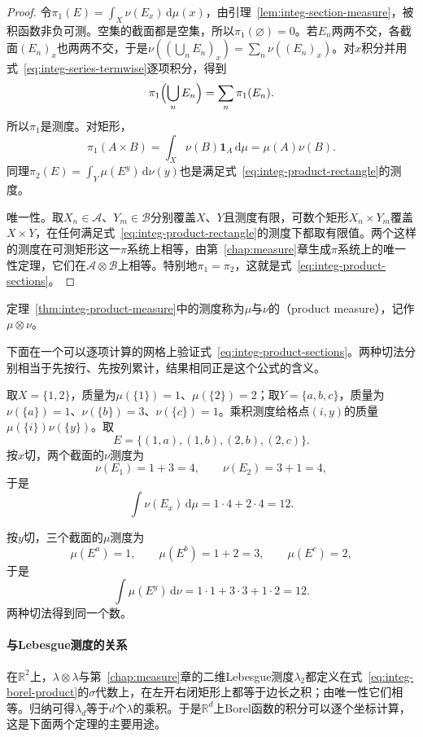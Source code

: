 \begin{proof}
令$\pi_1(E)=\int_X\nu(E_x)\,\mathrm d\mu(x)$，由引理~\ref{lem:integ-section-measure}，被积函数非负可测。空集的截面都是空集，所以$\pi_1(\varnothing)=0$。若$E_n$两两不交，各截面$(E_n)_x$也两两不交，于是$\nu((\bigcup_nE_n)_x)=\sum_n\nu((E_n)_x)$。对$x$积分并用式~\eqref{eq:integ-series-termwise}逐项积分，得到
\[
 \pi_1\Bigl(\bigcup_nE_n\Bigr)=\sum_n\pi_1(E_n).
\]
所以$\pi_1$是测度。对矩形，
\[
 \pi_1(A\times B)=\int_X\nu(B)\mathbf 1_A\,\mathrm d\mu=\mu(A)\nu(B).
\]
同理$\pi_2(E)=\int_Y\mu(E^y)\,\mathrm d\nu(y)$也是满足式~\eqref{eq:integ-product-rectangle}的测度。

唯一性。取$X_n\in\mathcal A$、$Y_m\in\mathcal B$分别覆盖$X$、$Y$且测度有限，可数个矩形$X_n\times Y_m$覆盖$X\times Y$，在任何满足式~\eqref{eq:integ-product-rectangle}的测度下都取有限值。两个这样的测度在可测矩形这一$\pi$系统上相等，由第~\ref{chap:measure}章生成$\pi$系统上的唯一性定理，它们在$\mathcal A\otimes\mathcal B$上相等。特别地$\pi_1=\pi_2$，这就是式~\eqref{eq:integ-product-sections}。
\end{proof}

\begin{definition}[乘积测度]
\label{def:integ-product-measure}
定理~\ref{thm:integ-product-measure}中的测度称为$\mu$与$\nu$的（product measure），记作$\mu\otimes\nu$。
\end{definition}

下面在一个可以逐项计算的网格上验证式~\eqref{eq:integ-product-sections}。两种切法分别相当于先按行、先按列累计，结果相同正是这个公式的含义。

\begin{example}[有限网格上的乘积测度]
\label{ex:integ-product-grid}
取$X=\{1,2\}$，质量为$\mu(\{1\})=1$、$\mu(\{2\})=2$；取$Y=\{a,b,c\}$，质量为$\nu(\{a\})=1$、$\nu(\{b\})=3$、$\nu(\{c\})=1$。乘积测度给格点$(i,y)$的质量$\mu(\{i\})\nu(\{y\})$。取
\[
 E=\{(1,a),(1,b),(2,b),(2,c)\}.
\]
按$x$切，两个截面的$\nu$测度为
\[
 \nu(E_1)=1+3=4,\qquad\nu(E_2)=3+1=4,
\]
于是
\[
 \int\nu(E_x)\,\mathrm d\mu=1\cdot4+2\cdot4=12 .
\]

按$y$切，三个截面的$\mu$测度为
\[
 \mu(E^a)=1,\qquad\mu(E^b)=1+2=3,\qquad\mu(E^c)=2,
\]
于是
\[
 \int\mu(E^y)\,\mathrm d\nu=1\cdot1+3\cdot3+1\cdot2=12 .
\]
两种切法得到同一个数。
\end{example}

\paragraph{与Lebesgue测度的关系}
在$\mathbb R^2$上，$\lambda\otimes\lambda$与第~\ref{chap:measure}章的二维Lebesgue测度$\lambda_2$都定义在式~\eqref{eq:integ-borel-product}的$\sigma$代数上，在左开右闭矩形上都等于边长之积；由唯一性它们相等。归纳可得$\lambda_d$等于$d$个$\lambda$的乘积。于是$\mathbb R^d$上Borel函数的积分可以逐个坐标计算，这是下面两个定理的主要用途。

